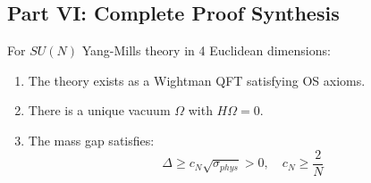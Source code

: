 \subsection{Part VI: Complete Proof Synthesis}
\label{subsec:final_synthesis}

\begin{theorem}
\label{thm:main_complete_rigorous}
For $SU(N)$ Yang-Mills theory in 4 Euclidean dimensions:
\begin{enumerate}
\item The theory exists as a Wightman QFT satisfying OS axioms.
\item There is a unique vacuum $\Omega$ with $H\Omega = 0$.
\item The mass gap satisfies:
\begin{equation}
\boxed{\Delta \geq c_N \sqrt{\sigma_{phys}} > 0, \quad c_N \geq \frac{2}{N}}
\end{equation}
\end{enumerate}
\end{theorem}

